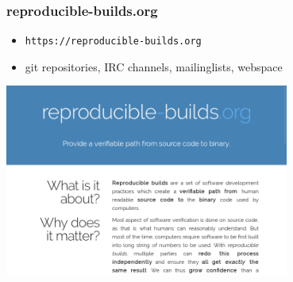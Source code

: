 \documentclass[14pt,aspectratio=169]{beamer}
\begin{document}
\begin{frame}
 \frametitle{reproducible-builds.org}

 \begin{itemize}
  \item \texttt{https://reproducible-builds.org}
  \item git repositories, IRC channels, mailinglists, webspace
 \end{itemize}
 \begin{center}
 \includegraphics[width=0.7\textwidth]{images/rbwww1.png}
 \end{center}
\end{frame}
\end{document}

